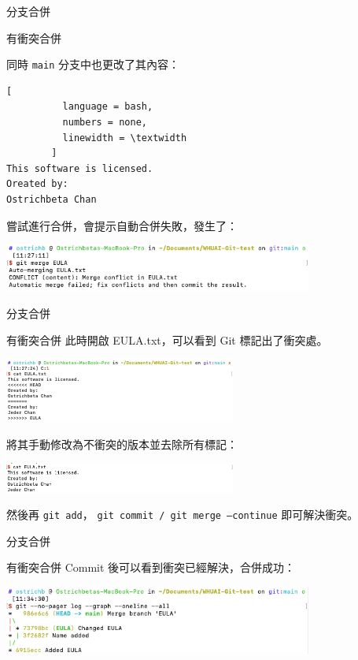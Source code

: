 \documentclass[xetex, unicode, 10pt, aspectratio=169]{beamer}
\begin{document}
\begin{frame}[fragile]{分支合併}
    \begin{block}{有衝突合併}

        同時 \texttt{main} 分支中也更改了其內容：
        \begin{lstlisting}[
          language = bash,
          numbers = none,
          linewidth = \textwidth
        ]
This software is licensed.
Oreated by:
Ostrichbeta Chan\end{lstlisting}
        嘗試進行合併，會提示自動合併失敗，發生了：
        \begin{center}
            \includegraphics[width=4in]{./img/git-merge-failed.png}
        \end{center}
    \end{block}
\end{frame}

\begin{frame}[fragile]{分支合併}
    \begin{block}{有衝突合併}
        此時開啟 EULA.txt，可以看到 Git 標記出了衝突處。
        \begin{center}
            \includegraphics[width=3in]{./img/open-conflict-file.png}
        \end{center}
        \pause
        將其手動修改為不衝突的版本並去除所有標記：
        \begin{center}
            \includegraphics[width=3in]{./img/resolve-conflict.png}
        \end{center}
        然後再 \texttt{git add}， \texttt{git commit / git merge --continue} 即可解決衝突。
    \end{block}
\end{frame}

\begin{frame}{分支合併}
    \begin{block}{有衝突合併}
        Commit 後可以看到衝突已經解決，合併成功：
        \begin{center}
            \includegraphics[width=4in]{./img/git-log-after-conflict-solved.png}
        \end{center}
    \end{block}
\end{frame}
\end{document}
